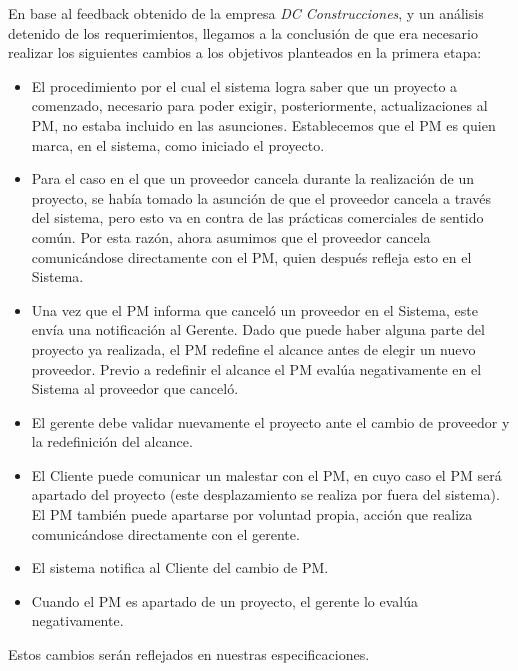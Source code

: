En base al feedback obtenido de la empresa \textit{DC Construcciones}, y un análisis detenido de los requerimientos, llegamos a la conclusión de que era necesario realizar los siguientes cambios a los objetivos planteados en la primera etapa:

\begin{itemize}
  \item El procedimiento por el cual el sistema logra saber que un proyecto a comenzado, necesario para poder exigir, posteriormente, actualizaciones al PM, no estaba incluido en las asunciones. Establecemos que el PM es quien marca, en el sistema, como iniciado el proyecto.
  \item Para el caso en el que un proveedor cancela durante la realización de un proyecto, se había tomado la asunción de que el proveedor cancela a través del sistema, pero esto va en contra de las prácticas comerciales de sentido común. Por esta razón, ahora asumimos que el proveedor cancela comunicándose directamente con el PM, quien después refleja esto en el Sistema.
  \item Una vez que el PM informa que canceló un proveedor en el Sistema, este envía una notificación al Gerente. Dado que puede haber alguna parte del proyecto ya realizada, el PM redefine el alcance antes de elegir un nuevo proveedor. Previo a redefinir el alcance el PM evalúa negativamente en el Sistema al proveedor que canceló.
  \item El gerente debe validar nuevamente el proyecto ante el cambio de proveedor y la redefinición del alcance.
  \item El Cliente puede comunicar un malestar con el PM, en cuyo caso el PM será apartado del proyecto (este desplazamiento se realiza por fuera del sistema). El PM también puede apartarse por voluntad propia, acción que realiza comunicándose directamente con el gerente.
  \item El sistema notifica al Cliente del cambio de PM.
  \item Cuando el PM es apartado de un proyecto, el gerente lo evalúa negativamente.

\end{itemize}

Estos cambios serán reflejados en nuestras especificaciones.
